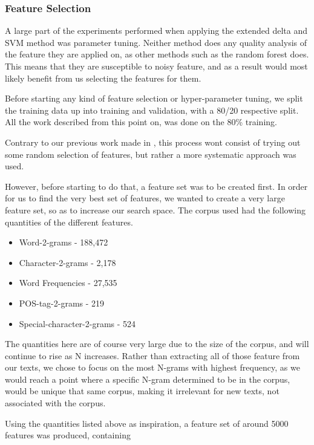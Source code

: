 \subsubsection{Feature Selection}

A large part of the experiments performed when applying the extended delta and
\gls{SVM} method was parameter tuning. Neither method does any quality analysis
of the feature they are applied on, as other methods such as the random forest
does. This means that they are susceptible to noisy feature, and as a result
would most likely benefit from us selecting the features for them.

Before starting any kind of feature selection or hyper-parameter tuning,
we split the training data up into training and validation, with a 
80/20 respective split. All the work described from this point on,
was done on the 80\% training.

Contrary to our previous work made in \cite{US}, this process wont
consist of trying out some random selection of features, but rather
a more systematic approach was used. 

However, before starting to do that, a feature set was to be created
first. In order for us to find the very best set of features, we wanted
to create a very large feature set, so as to increase our search space.
The corpus used had the following quantities of the different features.

\begin{itemize}
    \item Word-2-grams - 188,472
    \item Character-2-grams - 2,178
    \item Word Frequencies - 27,535
    \item \gls{POS}-tag-2-grams - 219
    \item Special-character-2-grams - 524
\end{itemize}

The quantities here are of course very large due to the size of the corpus,
and will continue to rise as N increases. Rather than extracting all
of those feature from our texts, we chose to focus on the most N-grams
with highest frequency, as we would reach a point where a specific N-gram
determined to be in the corpus, would be unique that same corpus, making it
irrelevant for new texts, not associated with the corpus.

Using the quantities listed above as inspiration, a feature set of around 5000
features was produced, containing

